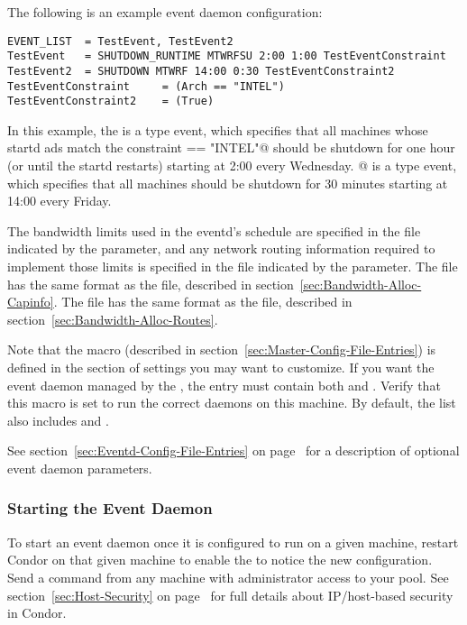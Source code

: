 The following is an example event daemon configuration:
\begin{verbatim}
EVENT_LIST	= TestEvent, TestEvent2
TestEvent	= SHUTDOWN_RUNTIME MTWRFSU 2:00 1:00 TestEventConstraint
TestEvent2	= SHUTDOWN MTWRF 14:00 0:30 TestEventConstraint2
TestEventConstraint		= (Arch == "INTEL")
TestEventConstraint2	= (True)
\end{verbatim}

In this example, the \verb@TestEvent@ is a 
type event, which
specifies that all machines whose startd ads match the constraint
\verb@Arch == "INTEL"@ should be shutdown for one hour (or until the
startd restarts) starting at 2:00 every Wednesday.
@ is a  type event, which specifies
that all machines should be shutdown for 30 minutes starting at
14:00 every Friday.

The bandwidth limits used in the eventd's schedule are specified in
the file indicated by the  parameter, and
any network routing information required to implement those limits is
specified in the file indicated by the 
parameter.
The  file has the same
format as the  file, described in
section~\ref{sec:Bandwidth-Alloc-Capinfo}.
The  file has the same
format as the  file, described in
section~\ref{sec:Bandwidth-Alloc-Routes}.

Note that the  macro (described in
section~\ref{sec:Master-Config-File-Entries}) is defined in the
section of settings you may want to customize.
If you want the event daemon managed by the , the
 entry must contain both 
 and .
Verify that this macro is set to run the correct daemons on
this machine.  By default, the list also includes
 and .

See section~\ref{sec:Eventd-Config-File-Entries} on
page~\pageref{sec:Eventd-Config-File-Entries} for a description of
optional event daemon parameters.

\subsubsection{\label{sec:Start-EventD} 
Starting the Event Daemon} 

To start an event daemon once it is configured to run on a given
machine, restart Condor on that given machine to enable
the  to notice the new configuration.
Send a  command from any machine
with administrator access to your pool.
See section~\ref{sec:Host-Security} on
page~\pageref{sec:Host-Security} for full details about IP/host-based
security in Condor.

